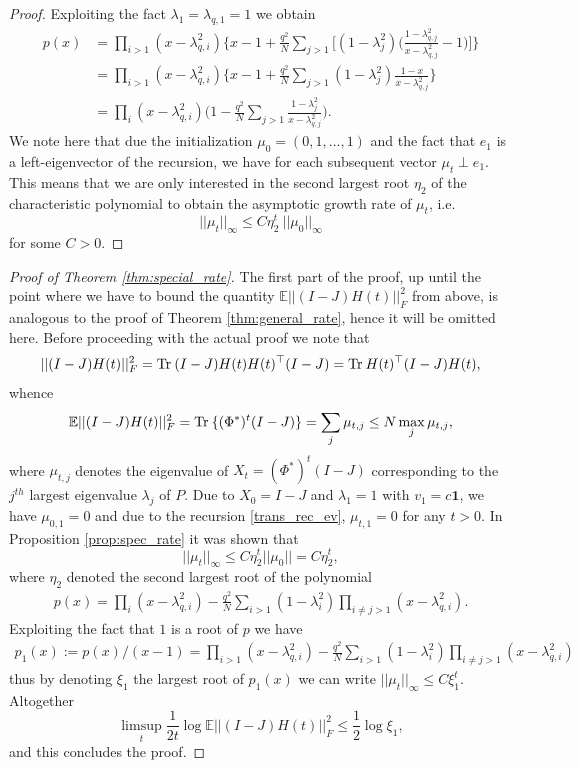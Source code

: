 \documentclass[a4paper,12pt]{article}
\def\tr{\mathrm{Tr}\hspace{0.8mm}}
\begin{document}
\begin{proof}
	Exploiting the fact $\lambda_1 = \lambda_{q,1}= 1$ we obtain
	\begin{align*}  p(x)&= \prod_{i>1}(x-\lambda_{q,i}^2)\bigg\{ x-1 + \frac {q^2}{N}\sum_{j>1}\bigg[ (1-\lambda_j^2)\bigg(\frac{1-\lambda_{q,j}^2}{x-\lambda_{q,j}^2} -1\bigg) \bigg] \bigg\} \\
		& = \prod_{i>1} (x-\lambda_{q,i}^2) \bigg\{x-1 + \frac {q^2}N \sum_{j>1} (1-\lambda_j^2)\frac{1-x}{x-\lambda_{q,j}^2} \bigg\}
		\\ &= \prod_i (x-\lambda_{q,i}^2)\bigg(1-\frac{q^2}N \sum_{j>1} \frac{1-\lambda_j^2}{x-\lambda_{q,j}^2}\bigg). 
	\end{align*}
	We note here that due the initialization $\mu_0 = (0,1,\ldots, 1)$ and the fact that $e_1$ is a left-eigenvector of the recursion, we have for each subsequent vector $\mu_t \perp e_1$. This means that we are only interested in the second largest root $\eta_2$ of the characteristic polynomial to obtain the asymptotic growth rate of $\mu_t$, i.e. 
	$$ ||\mu_t||_{\infty} \leq C\eta_2^t\ ||\mu_0||_{\infty} $$
	for some $C>0$.
\end{proof}      
\begin{proof}[Proof of Theorem \ref{thm:special_rate}]
	The first part of the proof, up until the point where we have to bound the quantity $\mathbb E ||(I-J)H(t)||_F^2$ from above, is analogous to the proof of Theorem \ref{thm:general_rate}, hence it will be omitted here. Before proceeding with the actual proof we note that 
	$$ ||(I-J)H(t)||_F^2 = \tr (I-J)H(t)H(t)^\top(I-J) = \tr H(t)^\top(I-J)H(t), $$
	whence
	$$ \mathbb E ||(I-J)H(t)||_F^2 = \tr \{(\Phi^*)^t(I-J)\} = \sum_j\mu_{t,j}\leq N \max_j \mu_{t,j},$$
	where $\mu_{t,j}$ denotes the eigenvalue of $X_t = (\Phi^*)^t(I-J)$ corresponding to the $j^{th}$ largest eigenvalue $\lambda_j$ of $P$. Due to $X_0 = I-J$ and $\lambda_1= 1$ with $v_1 = c \mathbf 1$, we have $\mu_{0,1} = 0$ and due to the recursion \eqref{trans_rec_ev}, $\mu_{t,1} = 0$ for any $t>0$. In Proposition \ref{prop:spec_rate} it was shown that 
	$$ ||\mu_t||_{\infty} \leq C \eta_2^t ||\mu_0|| = C \eta_2^t, $$ where $\eta_2$ denoted the second largest root of the polynomial
	\begin{align*}
		p(x) = \prod_{i} (x-\lambda_{q,i}^2) - \frac{q^2}N \sum_{i>1} (1-\lambda_i^2)\prod_{i\neq j>1} (x-\lambda_{q,i}^2).
	\end{align*}
	Exploiting the fact that $1$ is a root of $p$ we have
	\begin{align*}
		p_1(x) := p(x)/(x-1)=\prod_{i>1} (x-\lambda_{q,i}^2) - \frac{q^2}N \sum_{i>1} (1-\lambda_i^2)\prod_{i\neq j>1} (x-\lambda_{q,i}^2)
	\end{align*}
	thus by denoting $\xi_1$ the largest root of $p_1(x)$ we can write $||\mu_t||_\infty \leq C \xi_1^t$. Altogether
	$$ \limsup_t \frac1{2t}\log\mathbb E||(I-J)H(t)||_F^2 \leq \frac12 \log \xi_1 , $$
	and this concludes the proof.
\end{proof}  
\end{document}
